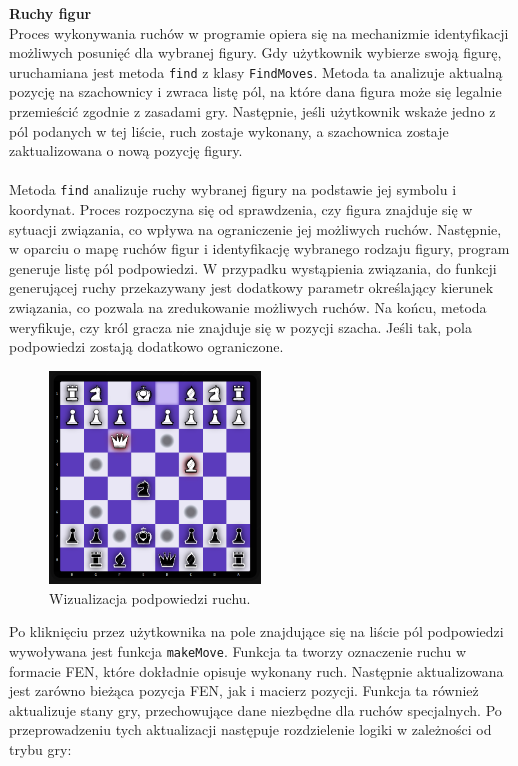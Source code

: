 \documentclass[12pt,a4paper]{article}
\begin{document}
\noindent \textbf{Ruchy figur}\\
Proces wykonywania ruchów w programie opiera się na mechanizmie identyfikacji możliwych posunięć dla wybranej figury. Gdy użytkownik wybierze swoją figurę, uruchamiana jest metoda \texttt{find} z klasy \texttt{FindMoves}. Metoda ta analizuje aktualną pozycję na szachownicy i zwraca listę pól, na które dana figura może się legalnie przemieścić zgodnie z zasadami gry. Następnie, jeśli użytkownik wskaże jedno z pól podanych w tej liście, ruch zostaje wykonany, a szachownica zostaje zaktualizowana o nową pozycję figury. 
\\\\
Metoda \texttt{find} analizuje ruchy wybranej figury na podstawie jej symbolu i koordynat. Proces rozpoczyna się od sprawdzenia, czy figura znajduje się w sytuacji związania, co wpływa na ograniczenie jej możliwych ruchów. Następnie, w oparciu o mapę ruchów figur i identyfikację wybranego rodzaju figury, program generuje listę pól podpowiedzi. W przypadku wystąpienia związania, do funkcji generującej ruchy przekazywany jest dodatkowy parametr określający kierunek związania, co pozwala na zredukowanie możliwych ruchów. Na końcu, metoda weryfikuje, czy król gracza nie znajduje się w pozycji szacha. Jeśli tak, pola podpowiedzi zostają dodatkowo ograniczone.

\vspace{0.5cm}
\begin{figure}[h!]
    \centering
    \includegraphics[width=0.5\textwidth]{images/imp_move_tips.png}
    \caption{Wizualizacja podpowiedzi ruchu.}
\end{figure}
\vspace{0.5cm}

\noindent
Po kliknięciu przez użytkownika na pole znajdujące się na liście pól podpowiedzi wywoływana jest funkcja \texttt{makeMove}. Funkcja ta tworzy oznaczenie ruchu w formacie FEN, które dokładnie opisuje wykonany ruch. Następnie aktualizowana jest zarówno bieżąca pozycja FEN, jak i macierz pozycji. Funkcja ta również aktualizuje stany gry, przechowujące dane niezbędne dla ruchów specjalnych. Po przeprowadzeniu tych aktualizacji następuje rozdzielenie logiki w zależności od trybu gry:
\end{document}
